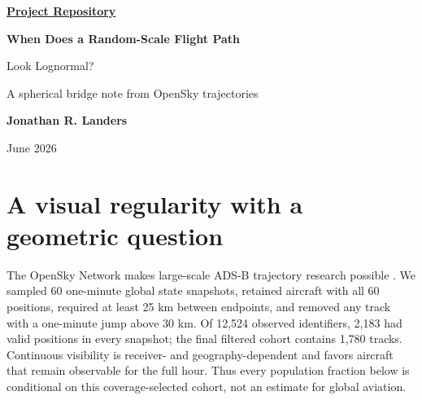 \documentclass[10pt]{article}
\theoremstyle{aerostat}
\begin{document}
\begin{center}
  {\small\href{https://github.com/jonland82/aerostat}{\faGithub\enspace\textbf{Project Repository}}}\par
  \vspace{7pt}
  {\LARGE\bfseries\color{DeepBlue}When Does a Random-Scale Flight Path\par Look Lognormal?}\par
  \vspace{4pt}
  {\large A spherical bridge note from OpenSky trajectories}\par
  \vspace{7pt}
  {\normalsize\textbf{Jonathan R. Landers}}\par
  {\small June 2026}
\end{center}
\vspace{-4pt}

\begin{abstract}
An hour of globally sampled aircraft positions produces a tempting picture: RMS departures from endpoint great-circle arcs are positive, strongly right-skewed, and superficially lognormal. We turn that visual hypothesis into a geometric model. Each deviation is factored as $D=AQ$, where $A$ sets route scale and $Q$ is the RMS shape of an endpoint-pinned bridge. We prove that an independent lognormal scale suppresses the non-Gaussian cumulants of $\log Q$ at explicit rates and give a Wasserstein convergence criterion. For a Brownian bridge, the criterion yields a concrete threshold. Yet the observed log-skewness and kurtosis sharply contradict the resulting single-population prediction. The same theorem that explains a lognormal-looking center therefore diagnoses a distinct near-geodesic boundary population, and a sequential small-ball test gives a retrospective, in-sample estimate of when that assignment becomes visible. The result is not a universal lognormal law, but a route from visual regularity to a falsifiable mixture model and a time-to-diagnosis statistic.
\end{abstract}

\section{A visual regularity with a geometric question}

The OpenSky Network makes large-scale ADS-B trajectory research possible \cite{schaefer2014}. We sampled 60 one-minute global state snapshots, retained aircraft with all 60 positions, required at least 25 km between endpoints, and removed any track with a one-minute jump above 30 km. Of 12,524 observed identifiers, 2,183 had valid positions in every snapshot; the final filtered cohort contains 1,780 tracks. Continuous visibility is receiver- and geography-dependent and favors aircraft that remain observable for the full hour. Thus every population fraction below is conditional on this coverage-selected cohort, not an estimate for global aviation.
\end{document}
